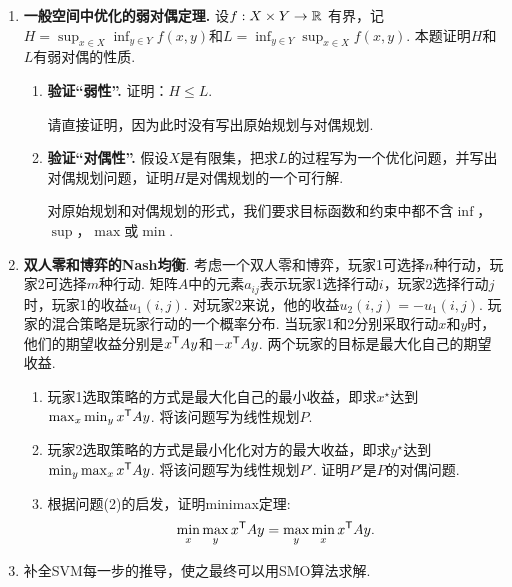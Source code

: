 \begin{enumerate}[wide, labelindent=0pt]
    \item \textbf{一般空间中优化的弱对偶定理. }设$f: X \times Y \to \mathbb{R}$ 有界，记$H = \sup_{x\in X}\inf_{y \in Y}f(x, y)$和$L = \inf_{y\in Y}\sup_{x \in X}f(x, y)$. 本题证明$H$和$L$有弱对偶的性质.
    \begin{enumerate}
        \item \textbf{验证“弱性”. }证明：$H \leq L$.
        \begin{hint}
            请直接证明，因为此时没有写出原始规划与对偶规划.
        \end{hint}
        \item \textbf{验证“对偶性”. }假设$X$是有限集，把求$L$的过程写为一个优化问题，并写出对偶规划问题，证明$H$是对偶规划的一个可行解.
        \begin{hint}
        对原始规划和对偶规划的形式，我们要求目标函数和约束中都不含$\inf$，$\sup$，$\max$或$\min$.
        \end{hint}
    \end{enumerate}
    
    \item \label{exercise:minimax-theorem}\textbf{双人零和博弈的Nash均衡}. 考虑一个双人零和博弈，玩家1可选择$n$种行动，玩家2可选择$m$种行动. 矩阵$A$中的元素$a_{ij}$表示玩家1选择行动$i$，玩家2选择行动$j$时，玩家1的收益$u_1(i,j)$. 对玩家2来说，他的收益$u_2(i,j)=-u_1(i,j)$. 玩家的混合策略是玩家行动的一个概率分布. 当玩家1和2分别采取行动$x$和$y$时，他们的期望收益分别是$x^{\mathsf{T}} Ay$和$-x^{\mathsf{T}} Ay$. 两个玩家的目标是最大化自己的期望收益.
    \begin{enumerate}
        \item 玩家1选取策略的方式是最大化自己的最小收益，即求$x^\star$达到$\max_x\min_y x^{\mathsf{T}} Ay$. 将该问题写为线性规划$P$.
        \item 玩家2选取策略的方式是最小化化对方的最大收益，即求$y^\star$达到$\min_y\max_x x^{\mathsf{T}} Ay$. 将该问题写为线性规划$P'$. 证明$P'$是$P$的对偶问题.
        \item 根据问题(2)的启发，证明minimax定理:
        \[\min_{x}\max_{y}x^{\mathsf{T}} Ay=\max_{y}\min_{x} x^{\mathsf{T}} Ay.\]
    \end{enumerate}

    \item \label{exercise:SVM-deduction} 补全SVM每一步的推导，使之最终可以用SMO算法求解.
\end{enumerate}
